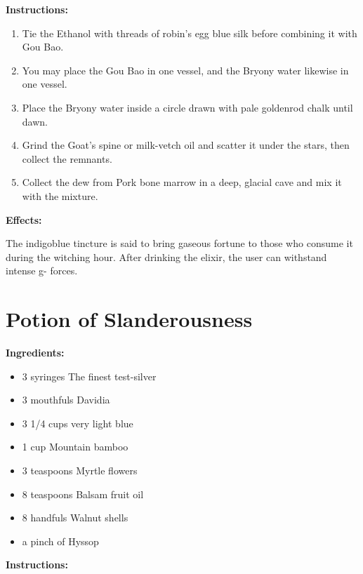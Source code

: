 \documentclass{article}
\begin{document}
\textbf{Instructions:}

\begin{enumerate}
  \item Tie the Ethanol with threads of robin's egg blue silk before combining it with Gou Bao.
  \item You may place the Gou Bao in one vessel, and the Bryony water likewise in one vessel.
  \item Place the Bryony water inside a circle drawn with pale goldenrod chalk until dawn.
  \item Grind the Goat's spine or milk-vetch oil and scatter it under the stars, then collect the remnants.
  \item Collect the dew from Pork bone marrow in a deep, glacial cave and mix it with the mixture.
\end{enumerate}

\textbf{Effects:}

The indigoblue tincture is said to bring gaseous fortune to those who consume it during the witching hour. After drinking the elixir, the user can withstand intense g- forces.

\newpage
\section*{Potion of Slanderousness}

\textbf{Ingredients:}

\begin{itemize}
  \item 3 syringes The finest test-silver
  \item 3 mouthfuls Davidia
  \item 3 1/4 cups very light blue
  \item 1 cup Mountain bamboo
  \item 3 teaspoons Myrtle flowers
  \item 8 teaspoons Balsam fruit oil
  \item 8 handfuls Walnut shells
  \item a pinch of Hyssop
\end{itemize}

\textbf{Instructions:}
\end{document}
